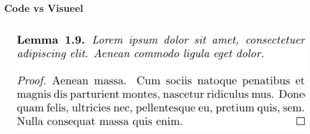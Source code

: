 \documentclass[presentatie.tex]{subfiles}
\begin{document}
    \begin{frame}
        \frametitle{Code vs Visueel}
        \begin{columns}
            \begin{column}{0.5\textwidth}
            \end{column}
            \begin{column}{0.5\textwidth}
                \includegraphics[width=\linewidth,height=0.8\textheight,keepaspectratio]{assets/latexRepeatEl.pdf}
            \end{column}
        \end{columns}
    \end{frame}
\end{document}
